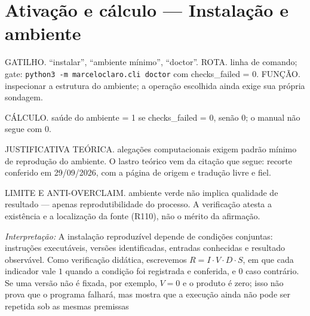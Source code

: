 \section[Ativação e cálculo]{Ativação e cálculo — Instalação e ambiente}

\begin{processo}
GATILHO. ``instalar'', ``ambiente mínimo'', ``doctor''.
ROTA. linha de comando; gate: \texttt{python3\ -m\ marceloclaro.cli\ doctor} com checks\_failed = 0.
FUNÇÃO. inspecionar a estrutura do ambiente; a operação escolhida ainda exige sua própria sondagem.
\end{processo}

\begin{resultado}
CÁLCULO. saúde do ambiente = 1 se checks\_failed = 0, senão 0; o manual não segue com 0.
\end{resultado}

\begin{descricao}
JUSTIFICATIVA TEÓRICA. alegações computacionais exigem padrão mínimo de reprodução do ambiente. O lastro teórico vem da citação que segue: recorte conferido em 29/09/2026, com a página de origem e tradução livre e fiel.
\end{descricao}

\begin{aviso}
LIMITE E ANTI-OVERCLAIM. ambiente verde não implica qualidade de resultado — apenas reprodutibilidade do processo. A verificação atesta a existência e a
localização da fonte (R110), não o mérito da afirmação.
\end{aviso}

\noindent\textit{Interpretação:} A instalação reproduzível depende de condições conjuntas: instruções executáveis, versões identificadas, entradas conhecidas e resultado observável. Como verificação didática, escrevemos $R=I\cdot V\cdot D\cdot S$, em que cada indicador vale $1$ quando a condição foi registrada e conferida, e $0$ caso contrário. Se uma versão não é fixada, por exemplo, $V=0$ e o produto é zero; isso não prova que o programa falhará, mas mostra que a execução ainda não pode ser repetida sob as mesmas premissas 

